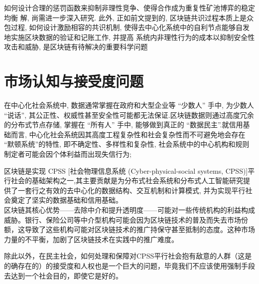 如何设计合理的惩罚函数来抑制非理性竞争、使得合作成为重复性矿池博弈的稳定均衡 解, 尚需进一步深入研究. 此外, 正如前文提到的, 区块链共识过程本质上是众包过程, 如何设计激励相容的共识机制, 使得去中心化系统中的自利节点能够自发地实施区块数据的验证和记账工作, 并提高 系统内非理性行为的成本以抑制安全性攻击和威胁, 是区块链有待解决的重要科学问题


\section{市场认知与接受度问题}

在中心化社会系统中, 数据通常掌握在政府和大型企业等 “少数人” 手中, 为少数人 “说话”, 其公正性、权威性甚至安全性可能都无法保证.区块链数据则通过高度冗余的分布式节点存储, 掌握在 “所有人” 手中, 能够做到真正的 “数据民主”.就信用基础而言, 中心化社会系统因其高度工程复杂性和社会复杂性而不可避免地会存在 “默顿系统”的特性, 即不确定性、多样性和复杂性, 社会系统中的中心机构和规则制定者可能会因个体利益而出现失信行为;

区块链是实现 CPSS [社会物理信息系统 (Cyber-physical-social systems, CPSS)]平行社会的基础架构之一,其主要贡献是为分布式社会系统和分布式人工智能研究提供了一套行之有效的去中心化的数据结构、交互机制和计算模式, 并为实现平行社会奠定了坚实的数据基础和信用基础。 \\

区块链其核心优势——去除中介和提升透明度——可能对一些传统机构的利益构成威胁。银行、保险公司等中介型机构可能会因为区块链技术的普及而失去市场份额，这导致了这些机构可能对区块链技术的推广持保守甚至抵制的态度。这种市场力量的不平衡，加剧了区块链技术在实践中的推广难度。

除此以外，在民主社会，如何处理和保障对CPSS平行社会抱有敌意的人群（这是的确存在的）的接受度和人权也是一个巨大的问题，毕竟我们不应该使用强制手段去达到一个社会目的，即使它是好的。

